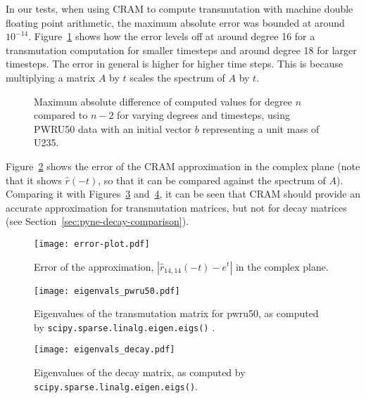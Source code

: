 In our tests, when using CRAM to compute transmutation with machine double
floating point arithmetic, the maximum absolute error was bounded at around
$10^{-14}$. Figure~\ref{fig:degrees} shows how the error levels off at around
degree 16 for a transmutation computation for smaller timesteps and around
degree 18 for larger timesteps. The error in general is higher for higher time
steps. This is because multiplying a matrix $A$ by $t$ scales the spectrum of
$A$ by $t$.

\begin{figure}[!ht]
\centering
\resizebox{0.9\textwidth}{!}{}
\caption{Maximum absolute difference of computed values for degree $n$
  compared to $n-2$ for varying degrees and timesteps, using PWRU50 data with
  an initial vector $b$ representing a unit mass of U235.}
\label{fig:degrees}
\end{figure}

Figure~\ref{fig:error-plot} shows the error of the CRAM approximation in the
complex plane (note that it shows $\hat{r}(-t)$, so that it can be compared
against the spectrum of $A$). Comparing it with
Figures~\ref{fig:eigenvals-pwru50} and~\ref{fig:eigenvals-decay}, it can be
seen that CRAM should provide an accurate approximation for transmutation
matrices, but not for decay matrices (see Section~\ref{sec:pyne-decay-comparison}).

\begin{figure}[!ht]
\centering
\texttt{[image: error-plot.pdf]}
\caption{Error of the approximation, $\left |\hat{r}_{14,14}(-t) - e^{t}\right
  |$ in the complex plane. }
\label{fig:error-plot}
\end{figure}

\begin{figure}[!ht]
\centering
\texttt{[image: eigenvals\_pwru50.pdf]}
\caption{Eigenvalues of the transmutation matrix for pwru50, as computed by
  \texttt{scipy.\allowbreak{}sparse.\allowbreak{}linalg.\allowbreak{}eigen.\allowbreak{}eigs()}
  .}
\label{fig:eigenvals-pwru50}
\end{figure}

\begin{figure}[!ht]
\centering
\texttt{[image: eigenvals\_decay.pdf]}
\caption{Eigenvalues of the decay matrix, as computed by
  \texttt{scipy.\allowbreak{}sparse.\allowbreak{}linalg.\allowbreak{}eigen.\allowbreak{}eigs()}.}
\label{fig:eigenvals-decay}
\end{figure}
